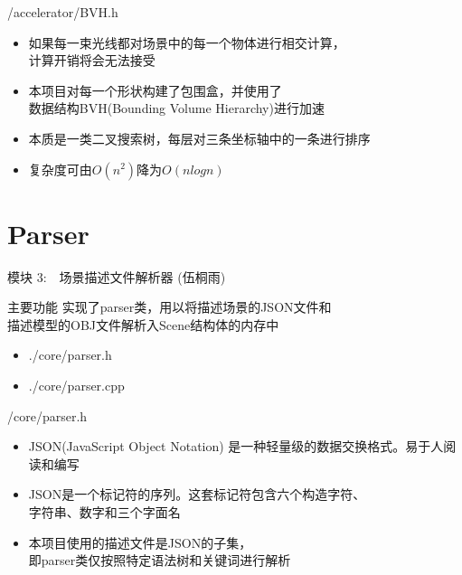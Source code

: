 \documentclass{beamer}
\begin{document}
\begin{frame} {/accelerator/BVH.h}
\begin{itemize} [<+->]
\item 如果每一束光线都对场景中的每一个物体进行相交计算，\\ 计算开销将会无法接受
\item 本项目对每一个形状构建了包围盒，并使用了\\数据结构BVH(Bounding Volume Hierarchy)进行加速
\item 本质是一类二叉搜索树，每层对三条坐标轴中的一条进行排序
\item 复杂度可由$O(n^2)$降为$O(n log n)$
\end{itemize}
\end{frame}

\section{Parser}
\begin{frame} {模块 3:　场景描述文件解析器 (伍桐雨) }
\begin{block}{主要功能}
    实现了parser类，用以将描述场景的JSON文件和 \\ 描述模型的OBJ文件解析入Scene结构体的内存中
  \end{block}
\begin{itemize}
			\item \begin{semiverbatim}
    ./core/parser.h
  \end{semiverbatim}
			\item \begin{semiverbatim}
    ./core/parser.cpp
  \end{semiverbatim}
\end{itemize}
\end{frame}

\begin{frame} {/core/parser.h}
\begin{itemize} [<+->]
\item JSON(JavaScript Object Notation) 是一种轻量级的数据交换格式。易于人阅读和编写
\item JSON是一个标记符的序列。这套标记符包含六个构造字符、\\ 字符串、数字和三个字面名
\item 本项目使用的描述文件是JSON的子集，\\ 即parser类仅按照特定语法树和关键词进行解析
\end{itemize}
\end{frame}
\end{document}
